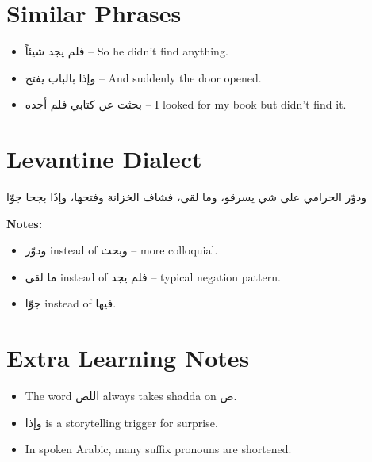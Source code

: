 \documentclass[a4paper,12pt]{article}
\begin{document}
\section{Similar Phrases}
\begin{itemize}
    \item \textarabic{فلم يجد شيئاً} – So he didn’t find anything.
    \item \textarabic{وإذا بالباب يفتح} – And suddenly the door opened.
    \item \textarabic{بحثت عن كتابي فلم أجده} – I looked for my book but didn’t find it.
\end{itemize}

\section{Levantine Dialect}
\begin{tcolorbox}[colback=sectionbg]
\textarabic{ودوّر الحرامي على شي يسرقو، وما لقى، فشاف الخزانة وفتحها، وإذَا بجحا جوّا}
\end{tcolorbox}
\textbf{Notes:}  
\begin{itemize}
    \item \textarabic{ودوّر} instead of \textarabic{وبحث} – more colloquial.  
    \item \textarabic{ما لقى} instead of \textarabic{فلم يجد} – typical negation pattern.  
    \item \textarabic{جوّا} instead of \textarabic{فيها}.  
\end{itemize}

\section{Extra Learning Notes}
\begin{itemize}
    \item The word \textarabic{اللص} always takes shadda on \textarabic{ص}.
    \item \textarabic{وإذا} is a storytelling trigger for surprise.
    \item In spoken Arabic, many suffix pronouns are shortened.
\end{itemize}
\end{document}
